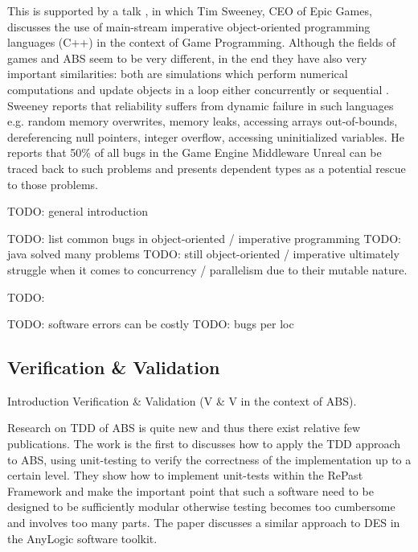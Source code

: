 This is supported by a talk \cite{sweeney_next_2006}, in which Tim Sweeney, CEO of Epic Games, discusses the use of main-stream imperative object-oriented programming languages (C++) in the context of Game Programming. Although the fields of games and ABS seem to be very different, in the end they have also very important similarities: both are simulations which perform numerical computations and update objects in a loop either concurrently or sequential \cite{gregory_game_2018}. Sweeney reports that reliability suffers from dynamic failure in such languages e.g. random memory overwrites, memory leaks, accessing arrays out-of-bounds, dereferencing null pointers, integer overflow, accessing uninitialized variables. He reports that 50\% of all bugs in the Game Engine Middleware Unreal can be traced back to such problems and presents dependent types as a potential rescue to those problems.

TODO: general introduction %


TODO: list common bugs in object-oriented / imperative programming
TODO: java solved many problems 
TODO: still object-oriented / imperative ultimately struggle when it comes to concurrency / parallelism due to their mutable nature.

TODO: \cite{vipindeep_list_2005}

TODO: software errors can be costly %
TODO: bugs per loc %

\subsection{Verification \& Validation}
Introduction Verification \& Validation (V \& V in the context of ABS).

Research on TDD of ABS is quite new and thus there exist relative few publications. The work \cite{collier_test-driven_2013} is the first to discusses how to apply the TDD approach to ABS, using unit-testing to verify the correctness of the implementation up to a certain level. They show how to implement unit-tests within the RePast Framework \cite{north_complex_2013} and make the important point that such a software need to be designed to be sufficiently modular otherwise testing becomes too cumbersome and involves too many parts. The paper \cite{asta_investigation_2014} discusses a similar approach to DES in the AnyLogic software toolkit. 

